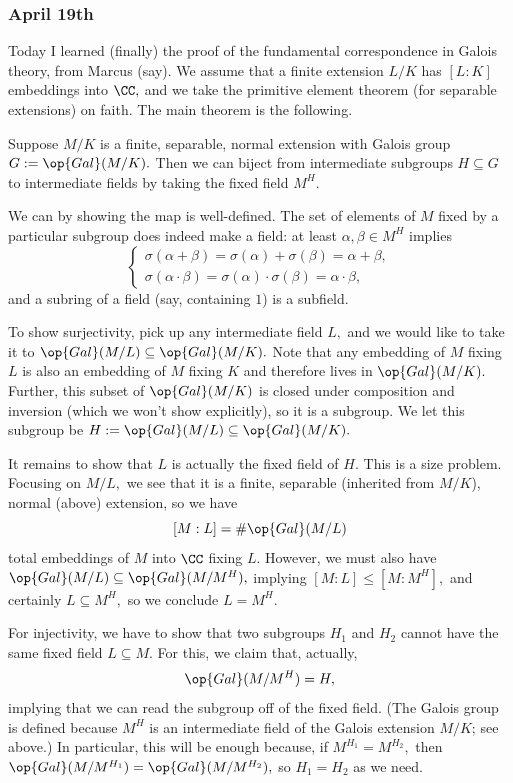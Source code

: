 \subsubsection{April 19th}
Today I learned (finally) the proof of the fundamental correspondence in Galois theory, from Marcus (say). We assume that a finite extension $L/K$ has $[L:K]$ embeddings into $\CC,$ and we take the primitive element theorem (for separable extensions) on faith. The main theorem is the following.
\begin{theorem}
    Suppose $M/K$ is a finite, separable, normal extension with Galois group $G:=\op{Gal}(M/K).$ Then we can biject from intermediate subgroups $H\subseteq G$ to intermediate fields by taking the fixed field $M^H.$
\end{theorem}
We can by showing the map is well-defined. The set of elements of $M$ fixed by a particular subgroup does indeed make a field: at least $\alpha,\beta\in M^H$ implies
\[\begin{cases}
    \sigma(\alpha+\beta)=\sigma(\alpha)+\sigma(\beta)=\alpha+\beta, \\
    \sigma(\alpha\cdot\beta)=\sigma(\alpha)\cdot\sigma(\beta)=\alpha\cdot\beta,
\end{cases}\]
and a subring of a field (say, containing $1$) is a subfield.

To show surjectivity, pick up any intermediate field $L,$ and we would like to take it to $\op{Gal}(M/L)\subseteq\op{Gal}(M/K).$ Note that any embedding of $M$ fixing $L$ is also an embedding of $M$ fixing $K$ and therefore lives in $\op{Gal}(M/K).$ Further, this subset of $\op{Gal}(M/K)$ is closed under composition and inversion (which we won't show explicitly), so it is a subgroup. We let this subgroup be $H:=\op{Gal}(M/L)\subseteq\op{Gal}(M/K).$

It remains to show that $L$ is actually the fixed field of $H.$ This is a size problem. Focusing on $M/L,$ we see that it is a finite, separable (inherited from $M/K$), normal (above) extension, so we have
\[[M:L]=\#\op{Gal}(M/L)\]
total embeddings of $M$ into $\CC$ fixing $L.$ However, we must also have $\op{Gal}(M/L)\subseteq\op{Gal}(M/M^H),$ implying $[M:L]\le[M:M^H],$ and certainly $L\subseteq M^H,$ so we conclude $L=M^H.$

For injectivity, we have to show that two subgroups $H_1$ and $H_2$ cannot have the same fixed field $L\subseteq M.$ For this, we claim that, actually,
\[\op{Gal}(M/M^H)=H,\]
implying that we can read the subgroup off of the fixed field. (The Galois group is defined because $M^H$ is an intermediate field of the Galois extension $M/K$; see above.) In particular, this will be enough because, if $M^{H_1}=M^{H_2},$ then $\op{Gal}(M/M^{H_1})=\op{Gal}(M/M^{H_2}),$ so $H_1=H_2$ as we need.

